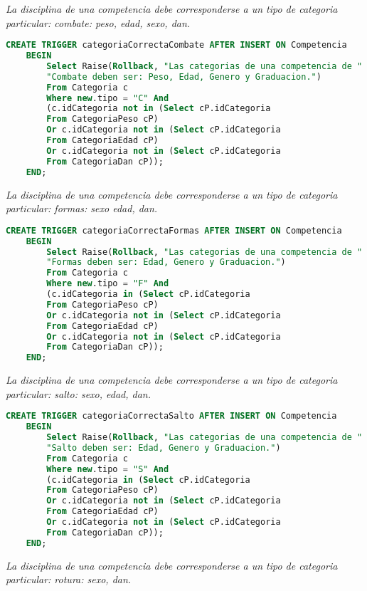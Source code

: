 \emph{
  La disciplina de una competencia debe corresponderse a un tipo de categoria particular: combate: peso, edad, sexo, dan.
}

\begin{lstlisting}[language=SQL]
CREATE TRIGGER categoriaCorrectaCombate AFTER INSERT ON Competencia
    BEGIN
        Select Raise(Rollback, "Las categorias de una competencia de "
        "Combate deben ser: Peso, Edad, Genero y Graduacion.")
        From Categoria c
        Where new.tipo = "C" And
        (c.idCategoria not in (Select cP.idCategoria 
        From CategoriaPeso cP)
        Or c.idCategoria not in (Select cP.idCategoria 
        From CategoriaEdad cP)
        Or c.idCategoria not in (Select cP.idCategoria 
        From CategoriaDan cP));
    END;
\end{lstlisting}
  
\emph{
  La disciplina de una competencia debe corresponderse a un tipo de categoria particular: formas: sexo edad, dan.
}

\begin{lstlisting}[language=SQL]
CREATE TRIGGER categoriaCorrectaFormas AFTER INSERT ON Competencia
    BEGIN
        Select Raise(Rollback, "Las categorias de una competencia de "
        "Formas deben ser: Edad, Genero y Graduacion.")
        From Categoria c
        Where new.tipo = "F" And
        (c.idCategoria in (Select cP.idCategoria 
        From CategoriaPeso cP)
        Or c.idCategoria not in (Select cP.idCategoria 
        From CategoriaEdad cP)
        Or c.idCategoria not in (Select cP.idCategoria 
        From CategoriaDan cP));
    END;
\end{lstlisting}
\emph{
  La disciplina de una competencia debe corresponderse a un tipo de categoria particular: salto: sexo, edad, dan.
}

\begin{lstlisting}[language=SQL]
CREATE TRIGGER categoriaCorrectaSalto AFTER INSERT ON Competencia
    BEGIN
        Select Raise(Rollback, "Las categorias de una competencia de "
        "Salto deben ser: Edad, Genero y Graduacion.")
        From Categoria c
        Where new.tipo = "S" And
        (c.idCategoria in (Select cP.idCategoria 
        From CategoriaPeso cP)
        Or c.idCategoria not in (Select cP.idCategoria 
        From CategoriaEdad cP)
        Or c.idCategoria not in (Select cP.idCategoria 
        From CategoriaDan cP));
    END;

\end{lstlisting}
\emph{
  La disciplina de una competencia debe corresponderse a un tipo de categoria particular: rotura: sexo, dan.
}


